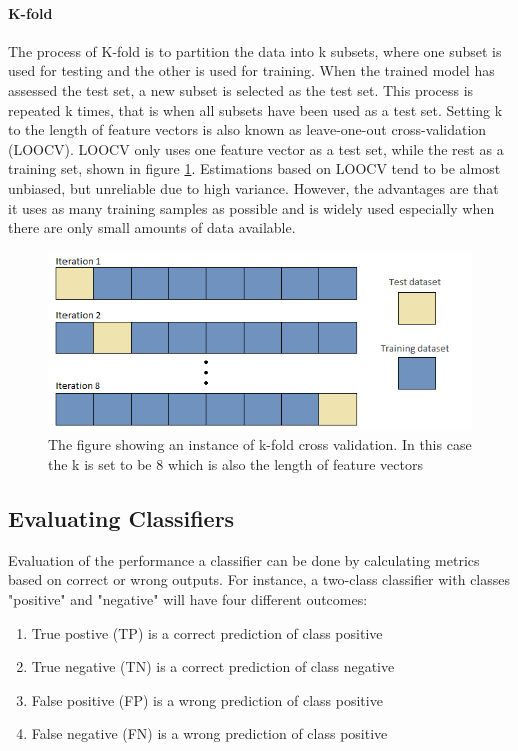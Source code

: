 \documentclass[USenglish]{ifimaster}  %
\begin{document}
\paragraph{K-fold}
The process of K-fold is to partition the data into k subsets, where one subset is used for testing and the other is used for training. When the trained model has assessed the test set, a new subset is selected as the test set. This process is repeated k times, that is when all subsets have been used as a test set. Setting k to the length of feature vectors is also known as leave-one-out cross-validation (LOOCV). LOOCV only uses one feature vector as a test set, while the rest as a training set, shown in figure \ref{fig:kfold}. Estimations based on LOOCV tend to be almost unbiased, but unreliable due to high variance. However, the advantages are that it uses as many training samples as possible and is widely used especially when there are only small amounts of data available.


 	
	\begin{figure}[h]
		\centering
		\includegraphics[scale=0.6]{Figures/Kfold}
		\caption{The figure showing an instance of k-fold cross validation. In this case the k is set to be 8 which is also the length of feature vectors}
		\label{fig:kfold}
	\end{figure}
	
	
	
\subsection{Evaluating Classifiers}\label{subsec:evalclf}
Evaluation of the performance a classifier can be done by calculating metrics based on correct or wrong outputs. For instance, a two-class classifier with classes "positive" and "negative" will have four different outcomes:
	
	\begin{enumerate}
		\item True postive (TP) is a correct prediction of class positive
		\item True negative (TN) is a correct prediction of class negative
		\item False positive (FP) is a wrong prediction of class positive
		\item False negative (FN) is a wrong prediction of class positive
	\end{enumerate}
	
\end{document}
